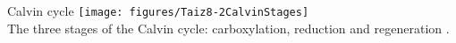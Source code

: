 \documentclass[10pt]{beamer}
\begin{document}
%
\begin{frame}{Calvin cycle}
    \centering
    \texttt{[image: figures/Taiz8-2CalvinStages]}\\
    {\small The three stages of the Calvin cycle: carboxylation, reduction and regeneration \autocite[from][]{TaiZei2006}.}
\end{frame}
%
%
\end{document}

